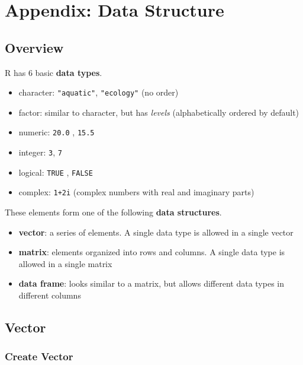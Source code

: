 \documentclass[
]{book}
\providecommand{\tightlist}{%
  \setlength{\itemsep}{0pt}\setlength{\parskip}{0pt}}
\begin{document}
\hypertarget{appendix-data-structure}{%
\chapter{Appendix: Data Structure}\label{appendix-data-structure}}

\hypertarget{overview}{%
\section{Overview}\label{overview}}

R has 6 basic \textbf{data types}.

\begin{itemize}
\tightlist
\item
  character: \texttt{"aquatic"}, \texttt{"ecology"} (no order)
\item
  factor: similar to character, but has \emph{levels} (alphabetically ordered by default)
\item
  numeric: \texttt{20.0} , \texttt{15.5}
\item
  integer: \texttt{3}, \texttt{7}
\item
  logical: \texttt{TRUE} , \texttt{FALSE}
\item
  complex: \texttt{1+2i} (complex numbers with real and imaginary parts)
\end{itemize}

These elements form one of the following \textbf{data structures}.

\begin{itemize}
\tightlist
\item
  \textbf{vector}: a series of elements. A single data type is allowed in a single vector
\item
  \textbf{matrix}: elements organized into rows and columns. A single data type is allowed in a single matrix
\item
  \textbf{data frame}: looks similar to a matrix, but allows different data types in different columns
\end{itemize}

\hypertarget{vector}{%
\section{Vector}\label{vector}}

\hypertarget{create-vector}{%
\subsection{Create Vector}\label{create-vector}}
\end{document}
